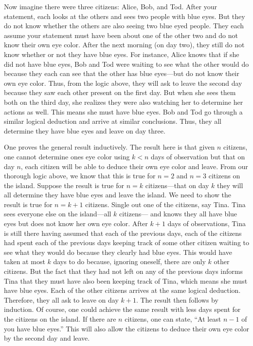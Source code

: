 \documentclass[11pt,letterpaper]{article}
\begin{document}
Now imagine there were three citizens: Alice, Bob, and Tod. After your statement, each looks at the others and sees two people with blue eyes. But they do not know whether the others are also seeing two blue eyed people. They each assume your statement must have been about one of the other two and do not know their own eye color. After the next morning (on day two), they still do not know whether or not they have blue eyes. For instance, Alice knows that if she did not have blue eyes, Bob and Tod were waiting to see what the other would do because they each can see that the other has blue eyes---but do not know their own eye color. Thus, from the logic above, they will ask to leave the second day because they saw each other present on the first day. But when she sees them both on the third day, she realizes they were also watching her to determine her actions as well. This means she must have blue eyes. Bob and Tod go through a similar logical deduction and arrive at similar conclusions. Thus, they all determine they have blue eyes and leave on day three. \pspace

One proves the general result inductively. The result here is that given $n$ citizens, one cannot determine ones eye color using $k < n$ days of observation but that on day $n$, each citizen will be able to deduce their own eye color and leave. From our thorough logic above, we know that this is true for $n= 2$ and $n= 3$ citizens on the island. Suppose the result is true for $n= k$ citizens---that on day $k$ they will all determine they have blue eyes and leave the island. We need to show the result is true for $n= k + 1$ citizens. Single out one of the citizens, say Tina. Tina sees everyone else on the island---all $k$ citizens--- and knows they all have blue eyes but does not know her own eye color. After $k + 1$ days of observations, Tina is still there having assumed that each of the previous days, each of the citizens had spent each of the previous days keeping track of some other citizen waiting to see what they would do because they clearly had blue eyes. This would have taken at most $k$ days to do because, ignoring oneself, there are only $k$ other citizens. But the fact that they had not left on any of the previous days informs Tina that they must have also been keeping track of Tina, which means she must have blue eyes. Each of the other citizens arrives at the same logical deduction. Therefore, they all ask to leave on day $k + 1$. The result then follows by induction. Of course, one could achieve the same result with less days spent for the citizens on the island. If there are $n$ citizens, one can state, ``At least $n - 1$ of you have blue eyes.'' This will also allow the citizens to deduce their own eye color by the second day and leave. 
\end{document}
